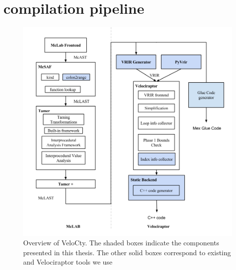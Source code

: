 \section{\velocty compilation pipeline}
\begin{figure}[htbp]
\begin{center}
\includegraphics[scale=0.5]{Figures/Overview_thesis.png}
\caption[Overview of the VeloCty]{Overview
of VeloCty. The shaded boxes indicate the components
presented in this thesis. The other solid boxes correspond to
existing \mclab and Velociraptor tools we use}\label{Fig:Overview}
\end{center}
\end{figure}
